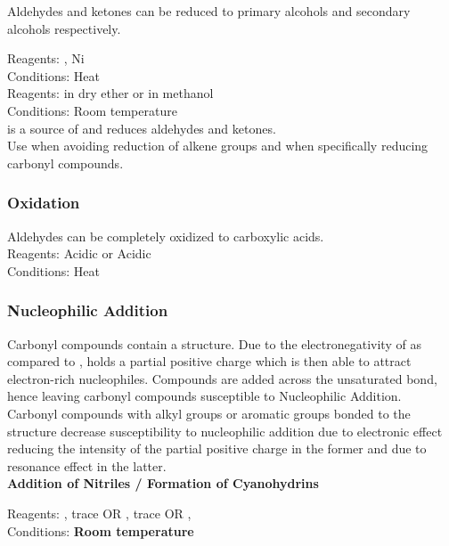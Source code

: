 \documentclass[../main]{subfiles}
\begin{document}
	Aldehydes and ketones can be reduced to primary alcohols and secondary alcohols respectively.

	Reagents: , Ni \\
	Conditions: Heat \\

	Reagents:  in dry ether or  in methanol\\
	Conditions: Room temperature \\

	 is a source of  and reduces aldehydes and ketones. \\

	Use  when avoiding reduction of alkene groups and  when specifically reducing carbonyl compounds. \\

	\subsubsection{Oxidation}

	Aldehydes can be completely oxidized to carboxylic acids. \\

	Reagents: Acidic  or Acidic  \\
	Conditions: Heat \\

	\subsubsection{Nucleophilic Addition}

	Carbonyl compounds contain a  structure. Due to the electronegativity of  as compared to ,  holds a partial positive charge which is then able to attract electron-rich nucleophiles. Compounds are added across the unsaturated  bond, hence leaving carbonyl compounds susceptible to Nucleophilic Addition. \\

	Carbonyl compounds with alkyl groups or aromatic groups bonded to the  structure decrease susceptibility to nucleophilic addition due to electronic effect reducing the intensity of the partial positive charge in the former and due to resonance effect in the latter. \\

	\noindent \textbf{Addition of Nitriles / Formation of Cyanohydrins}

	Reagents: , trace  OR , trace  OR ,  \\
	Conditions: \textbf{Room temperature} \\
\end{document}
